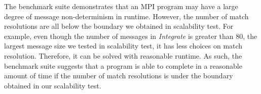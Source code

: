 The benchmark suite demonstrates that an MPI program may have a large degree of message non-determinism in runtime. However, the number of match resolutions are all below the boundary we obtained in scalability test. For example, even though the number of messages in \textit{Integrate} is greater than 80, the largest message size we tested in scalability test, it has less choices on match resolution. Therefore, it can be solved with reasonable runtime. As such, the benchmark suite suggests that a program is able to complete in a reasonable amount of time if the number of match resolutions is under the boundary obtained in our scalability test.
